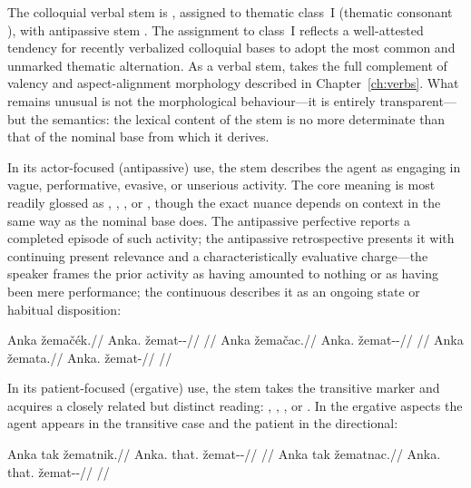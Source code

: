 The colloquial verbal stem is , assigned to thematic class~I
(thematic consonant ), with antipassive stem . The
assignment to class~I reflects a well-attested tendency for recently verbalized
colloquial bases to adopt the most common and unmarked thematic alternation.
As a verbal stem,  takes the full complement of valency and
aspect-alignment morphology described in Chapter~\ref{ch:verbs}. What remains
unusual is not the morphological behaviour---it is entirely transparent---but
the semantics: the lexical content of the stem is no more determinate than that
of the nominal base from which it derives.

In its actor-focused (antipassive) use, the stem describes the agent as
engaging in vague, performative, evasive, or unserious activity. The core
meaning is most readily glossed as , , , or , though the exact nuance depends on context in the same way as the
nominal base does. The antipassive perfective  reports a completed
episode of such activity; the antipassive retrospective  presents
it with continuing present relevance and a characteristically evaluative
charge---the speaker frames the prior activity as having amounted to nothing or
as having been mere performance; the continuous  describes it as
an ongoing state or habitual disposition:

\pex
\a
\begingl
\gla Anka žemačék.//
\glb Anka.\Dir{} žemat-\Antip{}-\Pf{}//
\glft {}//
\endgl
\a
\begingl
\gla Anka žemačac.//
\glb Anka.\Dir{} žemat-\Antip{}-\Ret{}//
\glft {}//
\endgl
\a
\begingl
\gla Anka žemata.//
\glb Anka.\Dir{} žemat-\Cont{}//
\glft {}//
\endgl
\xe

In its patient-focused (ergative) use, the stem  takes the
transitive marker  and acquires a closely related but distinct
reading: , , , or . In
the ergative aspects the agent appears in the transitive case and the patient
in the directional:

\pex
\a
\begingl
\gla Anka tak žematnik.//
\glb Anka.\Trs{} that.\Dir{} žemat-\Trs{}-\Pf{}//
\glft {}//
\endgl
\a
\begingl
\gla Anka tak žematnac.//
\glb Anka.\Trs{} that.\Dir{} žemat-\Trs{}-\Ret{}//
\glft {}//
\endgl
\xe


